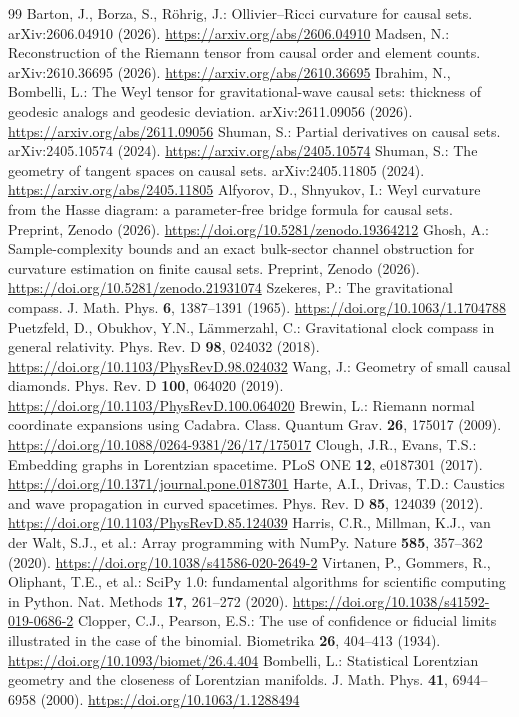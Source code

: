 \documentclass[11pt,a4paper]{article}
\newcommand{\doi}[1]{\url{https://doi.org/#1}}
\begin{document}
\begin{thebibliography}{99}
 Barton, J., Borza, S., R\"ohrig, J.: Ollivier--Ricci curvature for causal sets. arXiv:2606.04910 (2026). \url{https://arxiv.org/abs/2606.04910}
 Madsen, N.: Reconstruction of the Riemann tensor from causal order and element counts. arXiv:2610.36695 (2026). \url{https://arxiv.org/abs/2610.36695}
 Ibrahim, N., Bombelli, L.: The Weyl tensor for gravitational-wave causal sets: thickness of geodesic analogs and geodesic deviation. arXiv:2611.09056 (2026). \url{https://arxiv.org/abs/2611.09056}
 Shuman, S.: Partial derivatives on causal sets. arXiv:2405.10574 (2024). \url{https://arxiv.org/abs/2405.10574}
 Shuman, S.: The geometry of tangent spaces on causal sets. arXiv:2405.11805 (2024). \url{https://arxiv.org/abs/2405.11805}
 Alfyorov, D., Shnyukov, I.: Weyl curvature from the Hasse diagram: a parameter-free bridge formula for causal sets. Preprint, Zenodo (2026). \doi{10.5281/zenodo.19364212}
 Ghosh, A.: Sample-complexity bounds and an exact bulk-sector channel obstruction for curvature estimation on finite causal sets. Preprint, Zenodo (2026). \doi{10.5281/zenodo.21931074}
 Szekeres, P.: The gravitational compass. J. Math. Phys. \textbf{6}, 1387--1391 (1965). \doi{10.1063/1.1704788}
 Puetzfeld, D., Obukhov, Y.N., L\"ammerzahl, C.: Gravitational clock compass in general relativity. Phys. Rev. D \textbf{98}, 024032 (2018). \doi{10.1103/PhysRevD.98.024032}
 Wang, J.: Geometry of small causal diamonds. Phys. Rev. D \textbf{100}, 064020 (2019). \doi{10.1103/PhysRevD.100.064020}
 Brewin, L.: Riemann normal coordinate expansions using Cadabra. Class. Quantum Grav. \textbf{26}, 175017 (2009). \doi{10.1088/0264-9381/26/17/175017}
 Clough, J.R., Evans, T.S.: Embedding graphs in Lorentzian spacetime. PLoS ONE \textbf{12}, e0187301 (2017). \doi{10.1371/journal.pone.0187301}
 Harte, A.I., Drivas, T.D.: Caustics and wave propagation in curved spacetimes. Phys. Rev. D \textbf{85}, 124039 (2012). \doi{10.1103/PhysRevD.85.124039}
 Harris, C.R., Millman, K.J., van der Walt, S.J., et al.: Array programming with NumPy. Nature \textbf{585}, 357--362 (2020). \doi{10.1038/s41586-020-2649-2}
 Virtanen, P., Gommers, R., Oliphant, T.E., et al.: SciPy 1.0: fundamental algorithms for scientific computing in Python. Nat. Methods \textbf{17}, 261--272 (2020). \doi{10.1038/s41592-019-0686-2}
 Clopper, C.J., Pearson, E.S.: The use of confidence or fiducial limits illustrated in the case of the binomial. Biometrika \textbf{26}, 404--413 (1934). \doi{10.1093/biomet/26.4.404}
 Bombelli, L.: Statistical Lorentzian geometry and the closeness of Lorentzian manifolds. J. Math. Phys. \textbf{41}, 6944--6958 (2000). \doi{10.1063/1.1288494}
\end{thebibliography}
\end{document}
